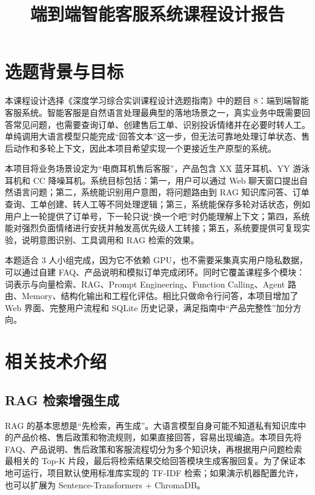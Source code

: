 \documentclass[12pt,a4paper]{ctexart}
\title{端到端智能客服系统课程设计报告}
\author{}
\date{}
\begin{document}
\maketitle
\tableofcontents
\newpage

\section{选题背景与目标}

本课程设计选择《深度学习综合实训课程设计选题指南》中的题目 8：端到端智能客服系统。智能客服是自然语言处理最典型的落地场景之一，真实业务中既需要回答常见问题，也需要查询订单、创建售后工单、识别投诉情绪并在必要时转人工。单纯调用大语言模型只能完成“回答文本”这一步，但无法可靠地处理订单状态、售后动作和多轮上下文，因此本项目希望实现一个更接近生产原型的系统。

本项目将业务场景设定为“电商耳机售后客服”，产品包含 XX 蓝牙耳机、YY 游泳耳机和 CC 降噪耳机。系统目标包括：第一，用户可以通过 Web 聊天窗口提出自然语言问题；第二，系统能识别用户意图，将问题路由到 RAG 知识库问答、订单查询、工单创建、转人工等不同处理逻辑；第三，系统能保存多轮对话状态，例如用户上一轮提供了订单号，下一轮只说“换一个吧”时仍能理解上下文；第四，系统能对强烈负面情绪进行安抚并触发高优先级人工转接；第五，系统要提供可复现实验，说明意图识别、工具调用和 RAG 检索的效果。

本题适合 3 人小组完成，因为它不依赖 GPU，也不需要采集真实用户隐私数据，可以通过自建 FAQ、产品说明和模拟订单完成闭环。同时它覆盖课程多个模块：词表示与向量检索、RAG、Prompt Engineering、Function Calling、Agent 路由、Memory、结构化输出和工程化评估。相比只做命令行问答，本项目增加了 Web 界面、完整用户流程和 SQLite 历史记录，满足指南中“产品完整性”加分方向。

\section{相关技术介绍}

\subsection{RAG 检索增强生成}

RAG 的基本思想是“先检索，再生成”。大语言模型自身可能不知道私有知识库中的产品价格、售后政策和物流规则，如果直接回答，容易出现编造。本项目先将 FAQ、产品说明、售后政策和客服流程切分为多个知识块，再根据用户问题检索最相关的 Top-K 片段，最后将检索结果交给回答模块生成客服回复。为了保证本地可运行，项目默认使用标准库实现的 TF-IDF 检索；如果演示机器配置允许，也可以扩展为 Sentence-Transformers + ChromaDB。
\end{document}

